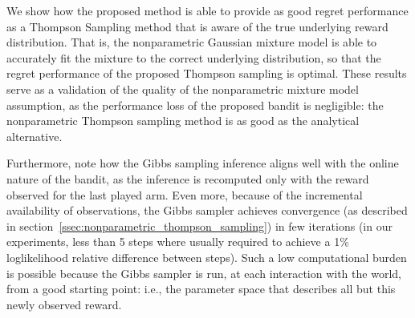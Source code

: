 \documentclass{article}
\newcommand{\ie}{i.e., }
\begin{document}
We show how the proposed method is able to provide as good regret performance as a Thompson Sampling method that is aware of the true underlying reward distribution. That is, the nonparametric Gaussian mixture model is able to accurately fit the mixture to the correct underlying distribution, so that the regret performance of the proposed Thompson sampling is optimal. These results serve as a validation of the quality of the nonparametric mixture model assumption, as the performance loss of the proposed bandit is negligible: the nonparametric Thompson sampling method is as good as the analytical alternative.

Furthermore, note how the Gibbs sampling inference aligns well with the online nature of the bandit, as the inference is recomputed only with the reward observed for the last played arm. Even more, because of the incremental availability of observations, the Gibbs sampler achieves convergence (as described in section~\ref{ssec:nonparametric_thompson_sampling}) in few iterations (in our experiments, less than 5 steps where usually required to achieve a 1\% loglikelihood relative difference between steps). Such a low computational burden is possible because the Gibbs sampler is run, at each interaction with the world, from a good starting point: \ie the parameter space that describes all but this newly observed reward.
\end{document}
